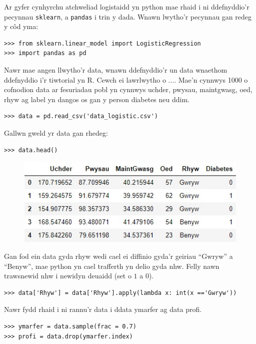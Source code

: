 Ar gyfer cynhyrchu atchweliad logistaidd yn python mae rhaid i ni ddefnyddio'r pecynnau \texttt{sklearn}, a \texttt{pandas} i trin y dada. Wnawn lwytho'r pecynnau gan redeg y c\^{o}d yma:

\begin{verbatim}
>>> from sklearn.linear_model import LogisticRegression
>>> import pandas as pd
\end{verbatim}

Nawr mae angen llwytho'r data, wnawn ddefnyddio'r un data wnaethom ddefnyddio i'r tiwtorial yn R. Cewch ei lawrlwytho o .... Mae'n cynnwys 1000 o cofnodion data ar fesuriadau pobl yn cynnwys uchder, pwysau, maintgwasg, oed, rhyw ag label yn dangos os gan y person diabetes neu ddim.  

\begin{verbatim}
>>> data = pd.read_csv('data_logistic.csv')
\end{verbatim}

Gallwn gweld yr data gan rhedeg:

\begin{verbatim}
>>> data.head()
\end{verbatim}

\begin{figure}[H]
\begin{center}
\includegraphics[width=0.5\linewidth]{../img/data_diabetes_python.jpg}
\end{center}
\end{figure}

Gan fod ein data gyda rhyw wedi cael ei diffinio gyda'r geiriau ``Gwryw'' a ``Benyw'', mae python yn cael trafferth yn delio gyda nhw. Felly nawn trawsnewid nhw i newidyn deuaidd (set o $1$ a $0$).

\begin{verbatim}
>>> data['Rhyw'] = data['Rhyw'].apply(lambda x: int(x =='Gwryw'))
\end{verbatim}

Nawr fydd rhaid i ni rannu'r data i ddata ymarfer ag data profi.

\begin{verbatim}
>>> ymarfer = data.sample(frac = 0.7)
>>> profi = data.drop(ymarfer.index)
\end{verbatim}


